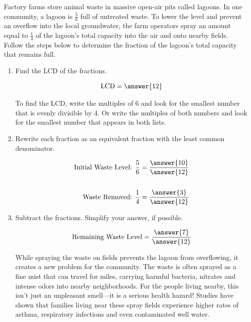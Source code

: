 \documentclass{ximera}
\begin{document}
\begin{problem}
Factory farms store animal waste in massive open-air pits called lagoons.  In one community, a lagoon is $\textstyle \frac{5}{6}$ 
full of untreated waste.  To lower the level and prevent an overflow into the local groundwater, the farm operators spray an amount 
equal to $\textstyle \frac{1}{4}$ of the lagoon's total capacity into the air and onto nearby fields.  Follow the steps below
to determine the fraction of the lagoon's total capacity that remains full.

\begin{enumerate}
\item Find the LCD of the fractions.

\[ \textrm{LCD} = \answer{12} \] 

\begin{hint}
To find the LCD, write the multiples of 6 and look for the smallest number that is evenly divisible by 4.  Or write the multiples of 
both numbers and look for the smallest number that appears in both lists.
\end{hint}

\item Rewrite each fraction as an equivalent fraction with the least common denominator.

\begin{align*}
\text{Initial Waste Level: } \frac{5}{6} &= \frac{\answer{10}}{\answer{12}} \\
& \\
\text{Waste Removed: } \frac{1}{4} &= \frac{\answer{3}}{\answer{12}}
\end{align*}

\item Subtract the fractions.  Simplify your answer, if possible. 

\[ \textrm{Remaining Waste Level}  = \frac{\answer{7}}{\answer{12}} \]

\begin{feedback}
While spraying the waste on fields prevents the lagoon from overflowing, it creates a new problem for the community.  The waste is 
often sprayed as a fine mist that can travel for miles, carrying harmful bacteria, nitrates and intense odors into nearby neighborhoods.
For the people living nearby, this isn't just an unpleasant smell---it is a serious health hazard! Studies have shown that families 
living near these spray fields experience higher rates of asthma, respiratory infections and even contaminated well water. 
\end{feedback}

\end{enumerate}

\end{problem}
\end{document}
